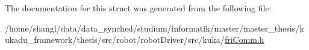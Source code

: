 \-The documentation for this struct was generated from the following file\-:\begin{DoxyCompactItemize}
\item 
/home/shangl/data/data\-\_\-synched/studium/informatik/master/master\-\_\-thesis/kukadu\-\_\-framework/thesis/src/robot/robot\-Driver/src/kuka/\hyperlink{friComm_8h}{fri\-Comm.\-h}\end{DoxyCompactItemize}
